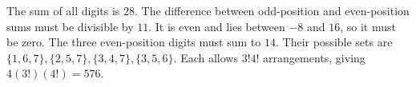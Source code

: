 The sum of all digits is $28$. The difference between odd-position and even-position sums must be divisible by $11$. It is even and lies between $-8$ and $16$, so it must be zero. The three even-position digits must sum to $14$. Their possible sets are $\{1,6,7\},\{2,5,7\},\{3,4,7\},\{3,5,6\}$. Each allows $3!4!$ arrangements, giving $\boxed{4(3!)(4!)=576}$.
